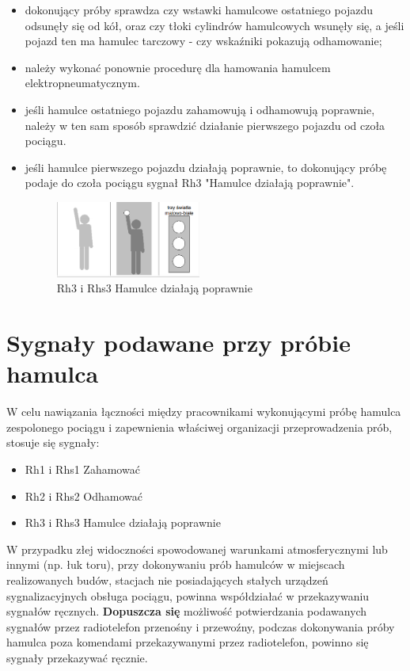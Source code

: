 \begin{itemize}
	\item dokonujący próby sprawdza czy wstawki hamulcowe ostatniego pojazdu odsunęły się od kół, oraz czy tłoki cylindrów hamulcowych wsunęły się, a jeśli pojazd ten ma hamulec tarczowy - czy wskaźniki pokazują odhamowanie; 
	\item należy wykonać ponownie procedurę dla hamowania hamulcem elektropneumatycznym.
	\item jeśli hamulce ostatniego pojazdu zahamowują i odhamowują poprawnie, należy w ten sam sposób sprawdzić działanie pierwszego pojazdu od czoła pociągu.
	\item jeśli hamulce pierwszego pojazdu działają poprawnie, to dokonujący próbę podaje do czoła pociągu sygnał Rh3 "Hamulce działają poprawnie".
	
\begin{figure}
		\includegraphics[width=0.45\textwidth]{skryptkierownik-img/skryptkierownik-img068.png}
		\caption{Rh3 i Rhs3 Hamulce działają poprawnie}
\end{figure}

\end{itemize}

\section{Sygnały podawane przy próbie hamulca}

W celu nawiązania łączności między pracownikami wykonującymi próbę hamulca zespolonego pociągu i zapewnienia właściwej organizacji przeprowadzenia prób, stosuje się sygnały:

\begin{itemize}
	\item Rh1 i Rhs1 Zahamować
	\item Rh2 i Rhs2 Odhamować
	\item Rh3 i Rhs3 Hamulce działają poprawnie
\end{itemize}


W przypadku złej widoczności spowodowanej warunkami atmosferycznymi lub innymi (np. łuk toru), przy dokonywaniu prób hamulców w miejscach realizowanych budów, stacjach nie posiadających stałych urządzeń sygnalizacyjnych obsługa pociągu, powinna współdziałać w przekazywaniu sygnałów ręcznych. \textbf{Dopuszcza się} możliwość potwierdzania podawanych sygnałów przez radiotelefon przenośny i przewoźny, podczas dokonywania próby hamulca poza komendami przekazywanymi przez radiotelefon, powinno się sygnały przekazywać ręcznie.

